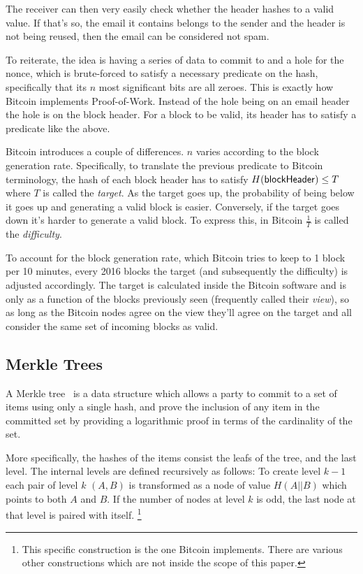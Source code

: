 The receiver can then very easily check whether the header hashes to a valid value. If that's so, the email it contains belongs to the sender and the header is not being reused, then the email can be considered not spam.

To reiterate, the idea is having a series of data to commit to and a hole for the nonce, which is brute-forced to satisfy a necessary predicate on the hash, specifically that its $n$ most significant bits are all zeroes. This is exactly how Bitcoin implements Proof-of-Work. Instead of the hole being on an email header the hole is on the block header. For a block to be valid, its header has to satisfy a predicate like the above.

Bitcoin introduces a couple of differences. $n$ varies according to the block generation rate. Specifically, to translate the previous predicate to Bitcoin terminology, the hash of each block header has to satisfy $H({\sf blockHeader}) \le T$ where $T$ is called the \emph{target}. As the target goes up, the probability of being below it goes up and generating a valid block is easier. Conversely, if the target goes down it's harder to generate a valid block. To express this, in Bitcoin $\frac{1}{T}$ is called the \emph{difficulty}.

To account for the block generation rate, which Bitcoin tries to keep to 1 block per 10 minutes, every 2016 blocks the target (and subsequently the difficulty) is adjusted accordingly. The target is calculated inside the Bitcoin software and is only as a function of the blocks previously seen (frequently called their \emph{view}), so as long as the Bitcoin nodes agree on the view they'll agree on the target and all consider the same set of incoming blocks as valid.

\subsection{Merkle Trees}
A Merkle tree~\cite{merkle} is a data structure which allows a party to
commit to a set of items using only a single hash, and prove the inclusion of
any item in the committed set by providing a logarithmic proof in terms of the
cardinality of the set.

More specifically, the hashes of the items consist the leafs of the tree, and
the last level. The internal levels are defined recursively as follows: To
create level $k-1$ each pair of level $k$ $(A, B)$ is transformed as a node
of value $H(A || B)$ which points to both $A$ and $B$. If the number of nodes
at level $k$ is odd, the last node at that level is paired with itself.
\footnote{This specific construction is the one Bitcoin implements. There are
various other constructions which are not inside the scope of this paper.}

